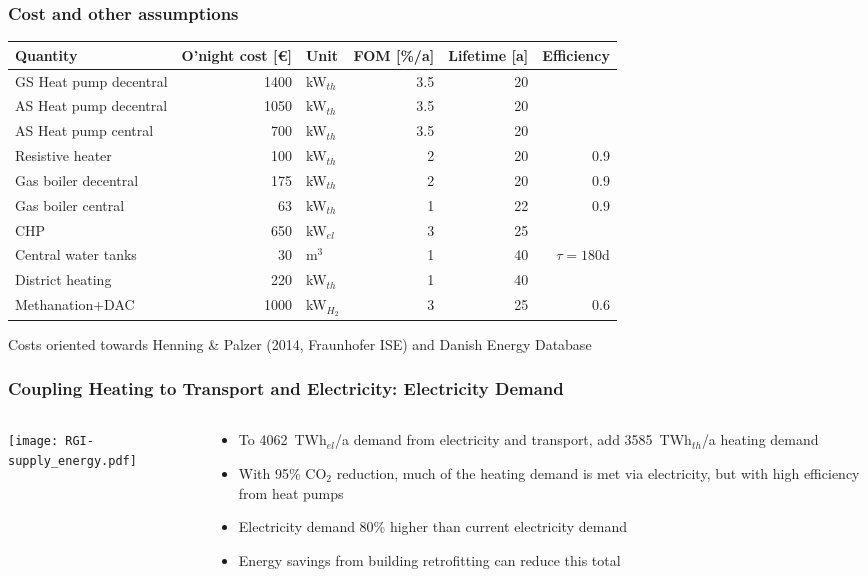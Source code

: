 \documentclass[10pt,aspectratio=169,dvipsnames]{beamer}
\def\el{${}_{el}$}
\def\th{${}_{th}$}
\let\olditem\item
\renewcommand{\item}{%
\olditem\vspace{5pt}}
\begin{document}
\begin{frame}
  \frametitle{Cost and other assumptions}

  \begin{table}
\centering
\begin{tabular}{@{}lrlrrr@{}}
\toprule
Quantity                & O'night cost [\euro]  &Unit & FOM [\%/a] & Lifetime [a] & Efficiency \\
\midrule
GS Heat pump decentral & 1400 & kW\th  & 3.5& 20 \\
AS Heat pump decentral & 1050 & kW\th  & 3.5& 20 \\
AS Heat pump central & 700 & kW\th  & 3.5& 20 \\
Resistive heater & 100  & kW\th  & 2& 20 & 0.9\\
Gas boiler decentral & 175  & kW\th  & 2& 20 & 0.9 \\
Gas boiler central & 63  & kW\th  & 1& 22 & 0.9 \\
CHP & 650 & kW\el & 3& 25\\
Central water tanks & 30 & m${}^3$  & 1& 40 & $\tau = 180$d\\
District heating & 220 & kW\th & 1 & 40 &  \\
Methanation+DAC & 1000 & kW$_{H_2}$ & 3 & 25  & 0.6\\
\bottomrule
\end{tabular}
\end{table}
  Costs oriented towards Henning \& Palzer (2014, Fraunhofer ISE) and Danish Energy Database
\end{frame}


\begin{frame}
  \frametitle{Coupling Heating to Transport and Electricity: Electricity Demand}
  \begin{columns}[T]
    \begin{column}{8cm}
      \texttt{[image: RGI-supply\_energy.pdf]}

    \end{column}
    \begin{column}{6cm}
      \begin{itemize}
      \item To 4062~TWh\el/a demand from electricity and transport, add 3585~TWh\th/a heating demand
      \item With 95\% CO$_2$ reduction, much of the heating demand is met via electricity, but with high efficiency from heat pumps
      \item Electricity demand 80\% higher than current electricity demand
      \item Energy savings from building retrofitting can reduce this total
      \end{itemize}
    \end{column}
  \end{columns}
\end{frame}
\end{document}
